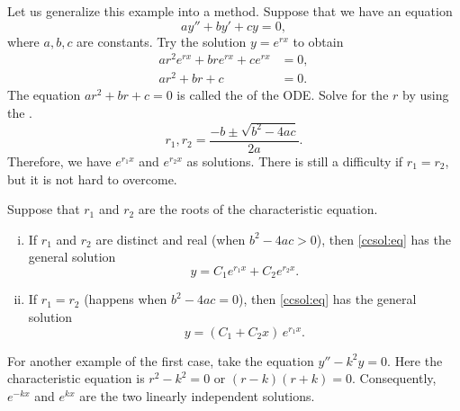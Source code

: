 Let us generalize this example into a method.
Suppose that we have an equation
\begin{equation} \label{ccsol:eq}
a y'' + b y' + c y = 0 ,
\end{equation}
where $a, b, c$ are constants.  Try the solution $y = e^{rx}$ to obtain
\begin{align*}
a r^2 e^{rx} + 
b r e^{rx} + 
c e^{rx} & = 0 , \\
a r^2 + 
b r + 
c & = 0 .
\end{align*}
The equation $a r^2 + b r + c = 0$ is called the \emph{} of the ODE.
Solve for the $r$ by using the .
\begin{equation*}
r_1, r_2 = \frac{-b \pm \sqrt{b^2 - 4ac}}{2a} .
\end{equation*}
Therefore, we have $e^{r_1 x}$ and $e^{r_2 x}$ as solutions.  There is
still a difficulty if $r_1 = r_2$, but it is not hard to overcome.

\begin{theorem}
Suppose that $r_1$ and $r_2$ are the roots of the characteristic equation.
\begin{enumerate}[(i)]
\item If $r_1$ and $r_2$ are distinct and real (when $b^2 - 4ac > 0$),
then \eqref{ccsol:eq} has the general solution
\begin{equation*}
y = C_1 e^{r_1 x} + C_2 e^{r_2 x} .
\end{equation*}
\item If $r_1 = r_2$ (happens when $b^2 - 4ac = 0$), 
then \eqref{ccsol:eq} has the general solution
\begin{equation*}
y = (C_1 + C_2 x)\, e^{r_1 x} .
\end{equation*}
\end{enumerate}
\end{theorem}

For another example of the
first case, take the equation $y'' - k^2 y = 0$.  Here the
characteristic equation is $r^2 - k^2 = 0$ or 
$(r-k)(r+k) = 0$.  Consequently, $e^{-k x}$ and $e^{kx}$ are the two
linearly independent solutions.

